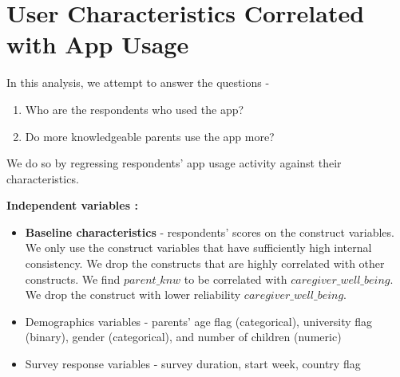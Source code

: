 \documentclass{article}
\begin{document}
% 
% 
% 

% 
% 
% 









% 
% 
% 

% 
% 
% 


\section{User Characteristics Correlated with App Usage}

In this analysis, we attempt to answer the questions -
\begin{enumerate}
    \item Who are the respondents who used the app?
    \item Do more knowledgeable parents use the app more?
\end{enumerate}

We do so by regressing respondents' app usage activity against their characteristics.
\vspace{1em}

\textbf{Independent variables :}
\begin{itemize}
    \item \textbf{Baseline characteristics} - respondents' scores on the construct variables. We only use the construct variables that have sufficiently high internal consistency. We drop the constructs that are highly correlated with other constructs. We find $parent\_knw$ to be correlated with $caregiver\_well\_being$. We drop the construct with lower reliability $caregiver\_well\_being$.
    \item Demographics variables - parents' age flag (categorical), university flag (binary), gender (categorical), and number of children (numeric)
    \item Survey response variables - survey duration, start week, country flag
\end{itemize}
\end{document}
